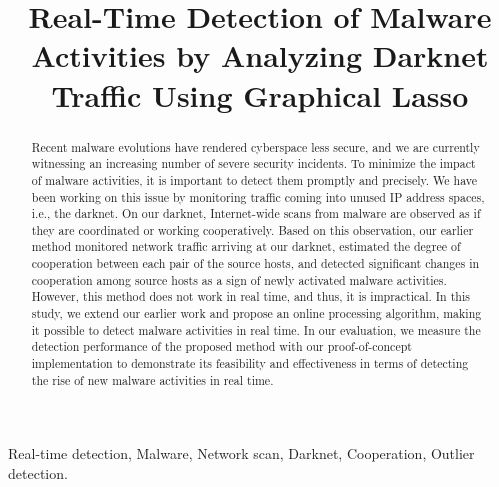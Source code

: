 \documentclass[conference]{IEEEtran}
\begin{document}
\title{
  Real-Time Detection of Malware Activities by Analyzing Darknet Traffic Using Graphical Lasso
}

\author{
}


\maketitle

\begin{abstract}
Recent malware evolutions have rendered cyberspace less secure, and we are currently witnessing an increasing number of severe security incidents.
To minimize the impact of malware activities, it is important to detect them promptly and precisely.
We have been working on this issue by monitoring traffic coming into unused IP address spaces, i.e., the darknet.
On our darknet, Internet-wide scans from malware are observed as if they are coordinated or working cooperatively.
Based on this observation, our earlier method monitored network traffic arriving at our darknet, estimated the degree of cooperation between each pair of the source hosts, and detected significant changes in cooperation among source hosts as a sign of newly activated malware activities.
However, this method does not work in real time, and thus, it is impractical.
In this study, we extend our earlier work and propose an online processing algorithm, making it possible to detect malware activities in real time.
In our evaluation, we measure the detection performance of the proposed method with our proof-of-concept implementation to demonstrate its feasibility and effectiveness in terms of detecting the rise of new malware activities in real time.
\end{abstract}

\begin{IEEEkeywords}
Real-time detection, Malware, Network scan, Darknet, Cooperation, Outlier detection.
\end{IEEEkeywords}
\end{document}

